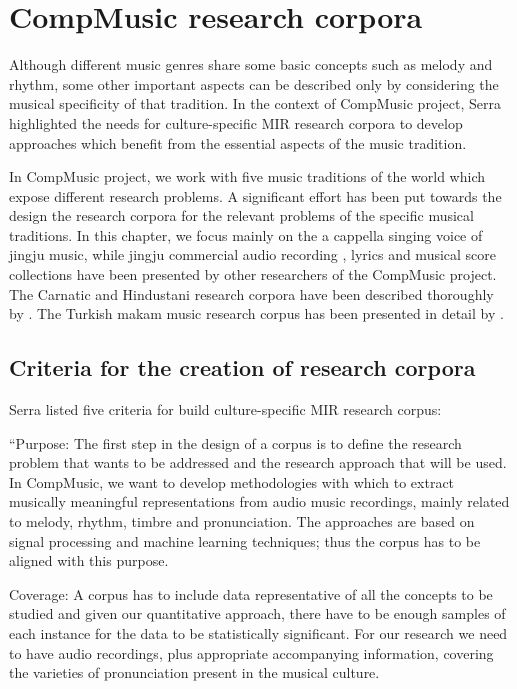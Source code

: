 \section{CompMusic research corpora}\label{sec:ch4:compmusic_corpora}

Although different music genres share some basic concepts such as melody and rhythm, some other important aspects can be described only by considering the musical specificity of that tradition. In the context of CompMusic project, Serra \cite{serra_multicultural_2011} highlighted the needs for culture-specific MIR research corpora to develop approaches which benefit from the essential aspects of the music tradition. 

In CompMusic project, we work with five music traditions of the world which expose different research problems. A significant effort has been put towards the design the research corpora for the relevant problems of the specific musical traditions. In this chapter, we focus mainly on the a cappella singing voice of jingju music, while jingju commercial audio recording \cite{repetto_creating_2014}, lyrics and musical score collections \cite{Repetto2017} have been presented by other researchers of the CompMusic project. The Carnatic and Hindustani research corpora have been described thoroughly by \cite{Srinivasamurthy2014}. The Turkish makam music research corpus has been presented in detail by \cite{Uyar2014a}.

\subsection{Criteria for the creation of research corpora}

Serra \cite{Serra2014} listed five criteria for build culture-specific MIR research corpus:

``Purpose: The first step in the design of a corpus is to define the research problem that wants to be addressed and the research approach that will be used. In CompMusic, we want to develop methodologies with which to extract musically meaningful representations from audio music recordings, mainly related to melody, rhythm, timbre and pronunciation. The approaches are based on signal processing and machine learning techniques; thus the corpus has to be aligned with this purpose.

Coverage: A corpus has to include data representative of all the concepts to be studied and given our quantitative approach, there have to be enough samples of each instance for the data to be statistically significant. For our research we need to have audio recordings, plus appropriate accompanying information, covering the varieties of pronunciation present in the musical culture.

